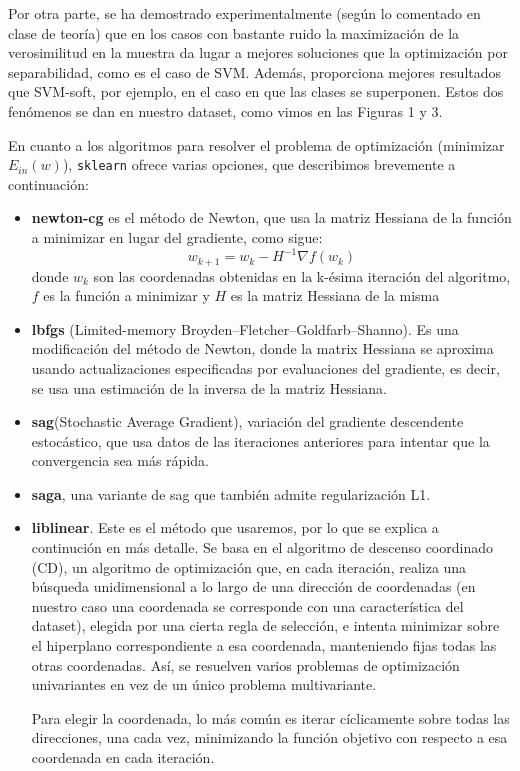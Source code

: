 \documentclass[a4]{article}
\begin{document}
Por otra parte, se ha demostrado experimentalmente (según lo comentado en clase de teoría) que en los casos con bastante ruido la maximización de la verosimilitud en la muestra da lugar a mejores soluciones que la optimización por separabilidad, como es el caso de SVM. Además, proporciona mejores resultados que SVM-soft, por ejemplo, en el caso en que las clases se superponen. Estos dos fenómenos se dan en nuestro dataset, como vimos en las Figuras 1 y 3.

En cuanto a los algoritmos para resolver el problema de optimización (minimizar $E_{in}(w)$), \lstinline|sklearn| ofrece varias opciones, que describimos brevemente a continuación: 
\begin{itemize}
	\item \textbf{newton-cg} es el método de Newton, que usa la matriz Hessiana de la función a minimizar en lugar del gradiente, como sigue: $$ w_{k+1}=w_{k}-H^{-1}\nabla f(w_k)$$ 
	donde $w_{k}$ son las coordenadas obtenidas en la k-ésima iteración del algoritmo, $f$ es la función a minimizar y $H$ es la matriz Hessiana de la misma
	\item \textbf{lbfgs} (Limited-memory Broyden–Fletcher–Goldfarb–Shanno). Es una modificación del método de Newton, donde la matrix Hessiana se aproxima usando actualizaciones especificadas por evaluaciones del gradiente, es decir, se usa una estimación de la inversa de la matriz Hessiana. 
	\item \textbf{sag}(Stochastic Average Gradient), variación del gradiente descendente estocástico, que usa datos de las iteraciones anteriores para intentar que la convergencia sea más rápida. 
	\item \textbf{saga}, una variante de sag que también admite regularización L1. 
	\item \textbf{liblinear}. Este es el método que usaremos, por lo que se explica a continución en más detalle. 
	Se basa en el algoritmo de descenso coordinado (CD), un algoritmo de optimización que, en cada iteración,  realiza una búsqueda unidimensional a lo largo de una dirección de coordenadas (en nuestro caso una coordenada se corresponde con una característica del dataset), elegida por una cierta regla de selección, e intenta minimizar sobre el hiperplano correspondiente a esa coordenada, manteniendo fijas todas las otras coordenadas. Así, se resuelven varios problemas de optimización univariantes en vez de un único problema multivariante. 
	
	Para elegir la coordenada, lo más común es iterar cíclicamente sobre todas las direcciones, una cada vez, minimizando la función objetivo con respecto a esa coordenada en cada iteración. 
	

\end{itemize}
\end{document}
